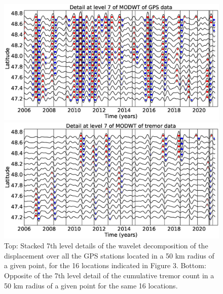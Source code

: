 \documentclass{article}
\begin{document}
\begin{figure}
\noindent\includegraphics[width=\textwidth, trim={0cm 0cm 0cm 0cm},clip]{figures/GPS_longer_detail_7.eps}

\noindent\includegraphics[width=\textwidth, trim={0cm 0cm 0cm 0cm},clip]{figures/tremor_longer_detail_7.eps}
\caption{Top: Stacked 7th level details of the wavelet decomposition of the displacement over all the GPS stations located in a 50 km radius of a given point, for the 16 locations indicated in Figure 3. Bottom: Opposite of the 7th level detail of the cumulative tremor count in a 50 km radius of a given point for the same 16 locations.}
\label{pngfiguresample}
\end{figure}
\end{document}
